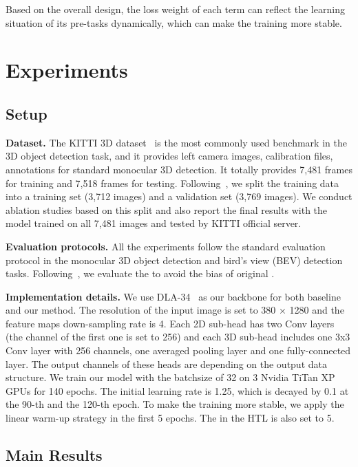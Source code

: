 \documentclass[10pt,twocolumn,letterpaper]{article}
\begin{document}
Based on the overall design, the loss weight of each term can reflect the learning situation of its pre-tasks dynamically, which can make the training more stable.

%
 

\section{Experiments}
\subsection{Setup}
\noindent
\textbf{Dataset.} The KITTI 3D dataset~\cite{kitti} is the most commonly used benchmark in the 3D object detection task, and it provides left camera images,  calibration files, annotations for standard monocular 3D detection. It totally provides 7,481 frames for training and 7,518 frames for testing.
Following~\cite{mono3d,mv3d}, we split the training data into a training set (3,712 images) and a validation set (3,769 images). 
We conduct ablation studies based on this split and also report the final results with the model trained on all 7,481 images and tested by KITTI official server.



\noindent
\textbf{Evaluation protocols.} All the experiments follow the standard evaluation protocol in the monocular 3D object detection and bird's view (BEV) detection tasks. 
Following~\cite{simonelli2019disentangling}, we evaluate the  to avoid the bias of original . 

\noindent
\textbf{Implementation details.} We use DLA-34~\cite{yu2018deep} as our backbone for both baseline and our method. The resolution of the input image is set to 380 × 1280 and the feature maps down-sampling rate is 4. Each 2D sub-head has two Conv layers (the channel of the first one is set to 256) and each 3D sub-head includes one 3x3 Conv layer with 256 channels, one averaged pooling layer and one fully-connected layer. The output channels of these heads are depending on the output data structure. We train our model with the batchsize of 32 on 3 Nvidia TiTan XP GPUs for 140 epochs. The initial learning rate is 1.25, which is decayed by 0.1 at the 90-th and the 120-th epoch. To make the training more stable, we apply the linear warm-up strategy in the first 5 epochs. The  in the HTL is also set to 5.

\subsection{Main Results}
\end{document}
